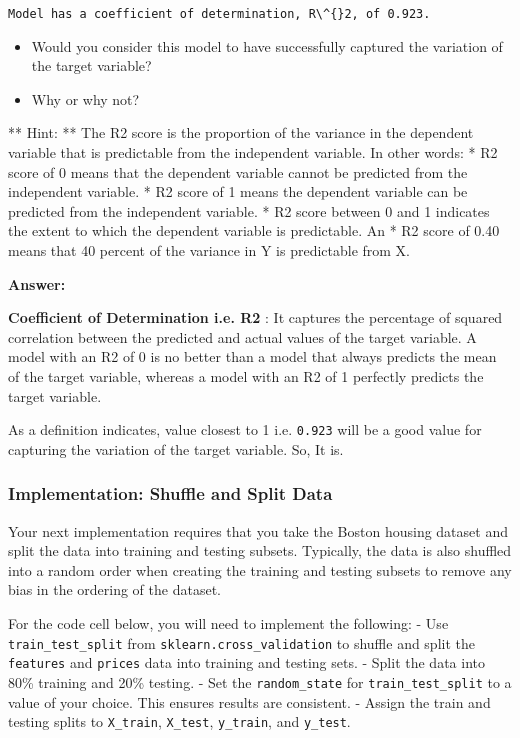 \documentclass[11pt]{article}
\providecommand{\tightlist}{%
      \setlength{\itemsep}{0pt}\setlength{\parskip}{0pt}}
\begin{document}
    \begin{Verbatim}[commandchars=\\\{\}]
Model has a coefficient of determination, R\^{}2, of 0.923.

    \end{Verbatim}

    \begin{itemize}
\tightlist
\item
  Would you consider this model to have successfully captured the
  variation of the target variable?
\item
  Why or why not?
\end{itemize}

** Hint: ** The R2 score is the proportion of the variance in the
dependent variable that is predictable from the independent variable. In
other words: * R2 score of 0 means that the dependent variable cannot be
predicted from the independent variable. * R2 score of 1 means the
dependent variable can be predicted from the independent variable. * R2
score between 0 and 1 indicates the extent to which the dependent
variable is predictable. An * R2 score of 0.40 means that 40 percent of
the variance in Y is predictable from X.

    \textbf{Answer:}

\textbf{Coefficient of Determination i.e. R2} : It captures the
percentage of squared correlation between the predicted and actual
values of the target variable. A model with an R2 of 0 is no better than
a model that always predicts the mean of the target variable, whereas a
model with an R2 of 1 perfectly predicts the target variable.

As a definition indicates, value closest to 1 i.e. \texttt{0.923} will
be a good value for capturing the variation of the target variable. So,
It is.

    \subsubsection{Implementation: Shuffle and Split
Data}\label{implementation-shuffle-and-split-data}

Your next implementation requires that you take the Boston housing
dataset and split the data into training and testing subsets. Typically,
the data is also shuffled into a random order when creating the training
and testing subsets to remove any bias in the ordering of the dataset.

For the code cell below, you will need to implement the following: - Use
\texttt{train\_test\_split} from \texttt{sklearn.cross\_validation} to
shuffle and split the \texttt{features} and \texttt{prices} data into
training and testing sets. - Split the data into 80\% training and 20\%
testing. - Set the \texttt{random\_state} for
\texttt{train\_test\_split} to a value of your choice. This ensures
results are consistent. - Assign the train and testing splits to
\texttt{X\_train}, \texttt{X\_test}, \texttt{y\_train}, and
\texttt{y\_test}.
\end{document}

